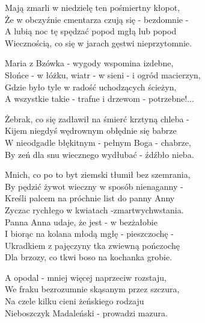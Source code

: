 \begin{text}
    Mają zmarli w niedzielę ten pośmiertny kłopot,\\
    Że w obczyźnie cmentarza czują się - bezdomnie -\\
    A lubią noc tę spędzać popod mgłą lub popod\\
    Wiecznością, co się w jarach gęstwi nieprzytomnie.

    Maria z Bzówka - wygody wspomina izdebne,\\
    Słońce - w łóżku, wiatr - w sieni - i ogród macierzyn,\\
    Gdzie było tyle w radość uchodzących ścieżyn,\\
    A wszystkie takie - trafne i drzewom - potrzebne!...

    Żebrak, co się zadławił na śmierć krztyną chleba -\\
    Kijem niegdyś wędrownym obłędnie się babrze\\
    W nieodgadle błękitnym - pełnym Boga - chabrze,\\
    By zeń dla snu wiecznego wydłubać - źdźbło nieba.

    Mnich, co po to byt ziemski tłumił bez szemrania,\\
    By pędzić żywot wieczny w sposób nienaganny -\\
    Kreśli palcem na próchnie list do panny Anny\\
    Zyczac rychłego w kwiatach -zmartwychwstania.\\

    Panna Anna udaje, że jest - w bezżałobie\\
    I biorąc na kolana młodą mgłę - pieszczochę -\\
    Ukradkiem z pajęczyny tka zwiewną pończochę\\
    Dla brzozy, co tkwi boso na kochanka grobie.

    A opodal - mniej więcej naprzeciw rozstaju,\\
    We fraku bezrozumnie skąsanym przez szczura,\\
    Na czele kilku cieni żeńskiego rodzaju\\
    Nieboszczyk Madaleński - prowadzi mazura.
\end{text}
\begin{chord}

\end{chord}